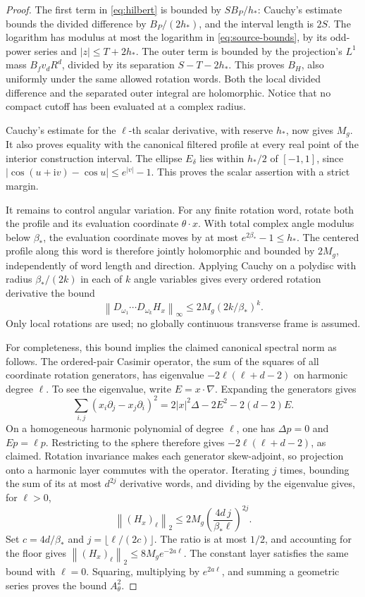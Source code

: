 \documentclass[11pt,letterpaper]{article}
\newcommand{\ii}{\mathrm i}
\newcommand{\norm}[1]{\left\lVert#1\right\rVert}
\theoremstyle{definition}
\theoremstyle{remark}
\begin{document}
\begin{proof}
The first term in \eqref{eq:hilbert} is bounded by \(SB_P/h_*\):
Cauchy's estimate bounds the divided difference by \(B_P/(2h_*)\), and
the interval length is \(2S\).
The logarithm has modulus at most the logarithm in \eqref{eq:source-bounds},
by its odd-power series and \(|z|\le T+2h_*\).
The outer term is bounded by the projection's \(L^1\) mass
\(B_fv_dR^d\), divided by its separation \(S-T-2h_*\).
This proves \(B_H\), also uniformly under the same allowed rotation words.
Both the local divided difference and the separated outer integral are
holomorphic. Notice that no compact cutoff has been evaluated at a complex
radius.

Cauchy's estimate for the \(\ell\)-th scalar derivative, with reserve \(h_*\),
now gives \(M_g\). It also proves equality with the canonical filtered
profile at every real point of the interior construction interval.
The ellipse \(E_\delta\) lies within \(h_*/2\) of \([-1,1]\), since
\(|\cos(u+\ii v)-\cos u|\le e^{|v|}-1\).
This proves the scalar assertion with a strict margin.

It remains to control angular variation. For any finite rotation word, rotate
both the profile and its evaluation coordinate \(\theta\cdot x\).
With total complex angle modulus below \(\beta_*\), the evaluation coordinate
moves by at most \(e^{2\beta_*}-1\le h_*\). The centered profile along this
word is therefore jointly holomorphic and bounded by \(2M_g\), independently
of word length and direction.
Applying Cauchy on a polydisc with radius \(\beta_*/(2k)\) in each of \(k\)
angle variables gives every ordered rotation derivative the bound
\[
 \norm{D_{\omega_1}\cdots D_{\omega_k}H_x}_\infty
       \le 2M_g(2k/\beta_*)^k.
\]
Only local rotations are used; no globally continuous transverse frame is assumed.

For completeness, this bound implies the claimed canonical spectral norm as
follows. The ordered-pair Casimir operator, the sum of the squares of all
coordinate rotation generators, has eigenvalue
\(-2\ell(\ell+d-2)\) on harmonic degree \(\ell\).
To see the eigenvalue, write \(E=x\cdot\nabla\). Expanding the generators gives
\[
 \sum_{i,j}(x_i\partial_j-x_j\partial_i)^2
       =2|x|^2\Delta-2E^2-2(d-2)E.
\]
On a homogeneous harmonic polynomial of degree \(\ell\), one has
\(\Delta p=0\) and \(Ep=\ell p\). Restricting to the sphere therefore gives
\(-2\ell(\ell+d-2)\), as claimed. Rotation invariance makes each generator
skew-adjoint, so projection onto a harmonic layer commutes with the operator.
Iterating \(j\) times, bounding the sum of its at most \(d^{2j}\) derivative
words, and dividing by the eigenvalue gives, for \(\ell>0\),
\[
 \norm{(H_x)_\ell}_2
 \le 2M_g\left(\frac{4d\,j}{\beta_*\ell}\right)^{2j}.
\]
Set \(c=4d/\beta_*\) and \(j=\lfloor\ell/(2c)\rfloor\).
The ratio is at most \(1/2\), and accounting for the floor gives
\(\norm{(H_x)_\ell}_2\le8M_ge^{-2a\ell}\).
The constant layer satisfies the same bound with \(\ell=0\).
Squaring, multiplying by \(e^{2a\ell}\), and summing a geometric series proves
the bound \(A_\theta^2\).


\end{proof}
\end{document}
